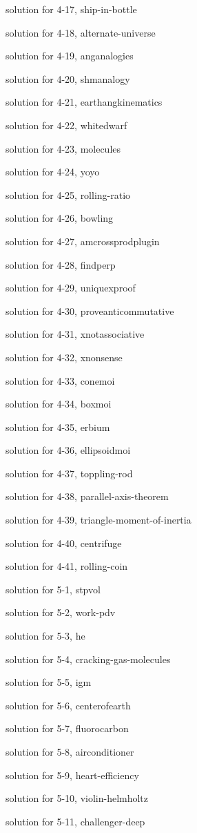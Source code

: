 \documentclass{problems}
\begin{document}
solution for 4-17, ship-in-bottle

solution for 4-18, alternate-universe

solution for 4-19, anganalogies

solution for 4-20, shmanalogy

solution for 4-21, earthangkinematics

solution for 4-22, whitedwarf

solution for 4-23, molecules

solution for 4-24, yoyo

solution for 4-25, rolling-ratio

solution for 4-26, bowling

solution for 4-27, amcrossprodplugin

solution for 4-28, findperp

solution for 4-29, uniquexproof

solution for 4-30, proveanticommutative

solution for 4-31, xnotassociative

solution for 4-32, xnonsense

solution for 4-33, conemoi

solution for 4-34, boxmoi

solution for 4-35, erbium

solution for 4-36, ellipsoidmoi

solution for 4-37, toppling-rod

solution for 4-38, parallel-axis-theorem

solution for 4-39, triangle-moment-of-inertia

solution for 4-40, centrifuge

solution for 4-41, rolling-coin

solution for 5-1, stpvol

solution for 5-2, work-pdv

solution for 5-3, he

solution for 5-4, cracking-gas-molecules

solution for 5-5, igm

solution for 5-6, centerofearth

solution for 5-7, fluorocarbon

solution for 5-8, airconditioner

solution for 5-9, heart-efficiency

solution for 5-10, violin-helmholtz

solution for 5-11, challenger-deep
\end{document}
